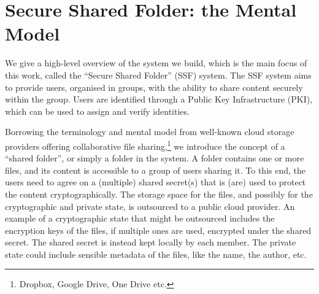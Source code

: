 

\section{Secure Shared Folder: the Mental Model}\label{sc:mental-model}

We give a high-level overview of the system we build,
which is the main focus of this work, 
called the ``Secure Shared Folder'' (SSF) system.
The SSF system aims to provide users, organised in groups, 
with the ability to share content securely within the group.
Users are identified through a Public Key Infrastructure (PKI),
which can be used to assign and verify identities.

Borrowing the terminology and mental model from well-known cloud storage providers offering collaborative file sharing,\footnote{Dropbox, Google Drive, One Drive etc.}
we introduce the concept of a ``shared folder'', or simply a folder in the system.
A folder contains one or more files, and its content is accessible to a group of users sharing it.
To this end, the users need to agree on a (multiple) shared secret(s) that is (are) used to protect the content cryptographically.
The storage space for the files, and possibly for the cryptographic and private state, is outsourced to a public cloud provider.
An example of a cryptographic state that might be outsourced includes the encryption keys of the files, if multiple ones are used, encrypted under the
shared secret. The shared secret is instead kept locally by each member. The private state could include sensible metadata of the files,
like the name, the author, etc.

